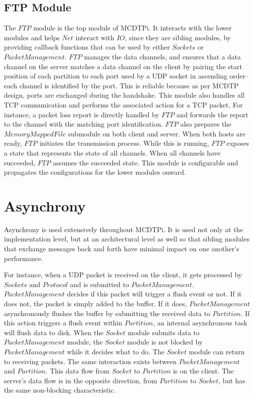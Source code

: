 \subsection{FTP Module}

The $FTP$ module is the top module of MCDTPi. It interacts with the lower modules and helps $Net$ interact with $IO$, since they are sibling modules, by providing callback functions that can be used by either $Sockets$ or $PacketManagement$. $FTP$ manages the data channels, and ensures that a data channel on the server matches a data channel on the client by pairing the start position of each partition to each port used by a UDP socket in ascending order--each channel is identified by the port. This is reliable because as per MCDTP design, ports are exchanged during the handshake. This module also handles all TCP communication and performs the associated action for a TCP packet. For instance, a packet loss report is directly handled by $FTP$ and forwards the report to the channel with the matching port identification. $FTP$ also prepares the $MemoryMappedFile$ submodule on both client and server. When both hosts are ready, $FTP$ initiates the transmission process. While this is running, $FTP$ exposes a state that represents the state of all channels. When all channels have succeeded, $FTP$ assumes the succeeded state. This module is configurable and propagates the configurations for the lower modules onward.

\section{Asynchrony}\label{sec:async-arch}

Asynchrony is used extensively throughout MCDTPi. It is used not only at the implementation level, but at an architectural level as well so that sibling modules that exchange messages back and forth have minimal impact on one another's performance.

For instance, when a UDP packet is received on the client, it gets processed by $Sockets$ and $Protocol$ and is submitted to $PacketManagement$. $PacketManagement$ decides if this packet will trigger a flush event or not. If it does not, the packet is simply added to the buffer. If it does, $PacketManagement$ asynchronously flushes the buffer by submitting the received data to $Partition$. If this action triggers a flush event within $Partition$, an internal asynchronous task will flush data to disk. When the $Socket$ module submits data to $PacketManagement$ module, the $Socket$ module is not blocked by $PacketManagement$ while it decides what to do. The $Socket$ module can return to receiving packets. The same interaction exists between $PacketManagement$ and $Partition$. This data flow from $Socket$ to $Partition$ is on the client. The server's data flow is in the opposite direction, from $Partition$ to $Socket$, but has the same non-blocking characteristic.

